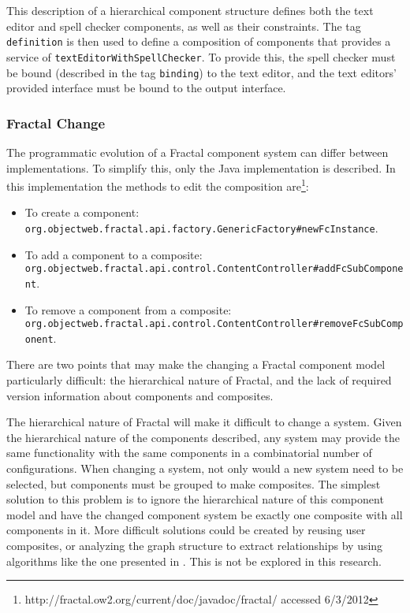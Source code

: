 This description of a hierarchical component structure defines both the text editor and spell checker components, as well as their constraints.
The tag \texttt{definition} is then used to define a composition of components that provides a service of \texttt{textEditorWithSpellChecker}.
To provide this, the spell checker must be bound (described in the tag \texttt{binding}) to the text editor,
and the text editors' provided interface must be bound to the output interface. 

\subsubsection{Fractal Change}
The programmatic evolution of a Fractal component system can differ between implementations.
To simplify this, only the Java implementation is described. 
In this implementation the methods to edit the composition are\footnote{http://fractal.ow2.org/current/doc/javadoc/fractal/ accessed 6/3/2012}:
\begin{itemize}
  \item To create a component: \\ \texttt{org.objectweb.fractal.api.factory.GenericFactory}\verb+#+\texttt{newFcInstance}.
  \item To add a component to a composite: \\ \texttt{org.objectweb.fractal.api.control.ContentController}\verb+#+\texttt{addFcSubComponent}.
  \item To remove a component from a composite: \\ \texttt{org.objectweb.fractal.api.control.ContentController}\verb+#+\texttt{removeFcSubComponent}.
\end{itemize}

There are two points that may make the changing a Fractal component model particularly difficult:
the hierarchical nature of Fractal, and the lack of required version information about components and composites.

The hierarchical nature of Fractal will make it difficult to change a system. 
Given the hierarchical nature of the components described, any system may provide the same functionality with the same components in a combinatorial number of configurations.
When changing a system, not only would a new system need to be selected, but components must be grouped to make composites.
The simplest solution to this problem is to ignore the hierarchical nature of this component model
and have the changed component system be exactly one composite with all components in it.
More difficult solutions could be created by reusing user composites,
or analyzing the graph structure to extract relationships by using algorithms like the one presented in \citep{dietrich2008cluster}.
This is not be explored in this research.

